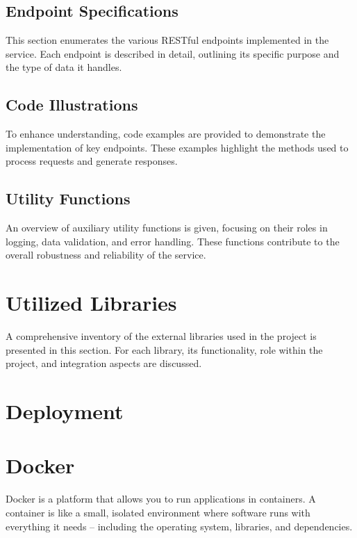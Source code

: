 \subsection{Endpoint Specifications}
This section enumerates the various RESTful endpoints implemented in the service. Each endpoint is described in detail, outlining its specific purpose and the type of data it handles.

\subsection{Code Illustrations}
To enhance understanding, code examples are provided to demonstrate the implementation of key endpoints. These examples highlight the methods used to process requests and generate responses.
\subsection{Utility Functions}
An overview of auxiliary utility functions is given, focusing on their roles in logging, data validation, and error handling. These functions contribute to the overall robustness and reliability of the service.


\section{Utilized Libraries}
A comprehensive inventory of the external libraries used in the project is presented in this section. For each library, its functionality, role within the project, and integration aspects are discussed.


\section{Deployment}


\section{Docker}
\label{sec:docker}
Docker is a platform that allows you to run applications in containers. A container is like a small, isolated environment where software runs with everything it needs – including the operating system, libraries, and dependencies.

